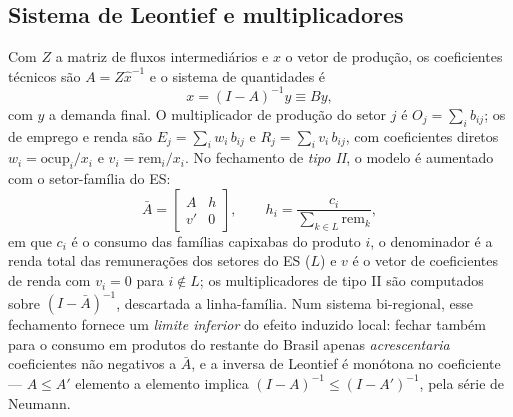 \documentclass[11pt,a4paper]{article}
\begin{document}
\subsection{Sistema de Leontief e multiplicadores}
\label{ap:leontief}
Com $Z$ a matriz de fluxos intermediários e $x$ o vetor de produção, os coeficientes técnicos
são $A=Z\hat{x}^{-1}$ e o sistema de quantidades é
\begin{equation}
x=(I-A)^{-1}y \equiv By,
\label{eq:leontief}
\end{equation}
com $y$ a demanda final. O multiplicador de produção do setor $j$ é $O_j=\sum_i b_{ij}$; os de
emprego e renda são $E_j=\sum_i w_i\,b_{ij}$ e $R_j=\sum_i v_i\,b_{ij}$, com coeficientes
diretos $w_i=\mathrm{ocup}_i/x_i$ e $v_i=\mathrm{rem}_i/x_i$. No fechamento de
\emph{tipo II}, o modelo é aumentado com o setor-família do ES:
\begin{equation}
\bar{A}=\begin{bmatrix} A & h\\ v' & 0\end{bmatrix},
\qquad h_i=\frac{c_i}{\sum_{k\in L}\mathrm{rem}_k},
\label{eq:tipo2}
\end{equation}
em que $c_i$ é o consumo das famílias capixabas do produto $i$, o denominador é a renda
total das remunerações dos setores do ES ($L$) e $v$ é o vetor de coeficientes de renda
com $v_i=0$ para $i\notin L$; os multiplicadores de tipo II são computados sobre
$(I-\bar{A})^{-1}$, descartada a linha-família. Num sistema bi-regional, esse fechamento
fornece um \emph{limite inferior} do efeito induzido local: fechar também para o consumo
em produtos do restante do Brasil apenas \emph{acrescentaria} coeficientes não negativos
a $\bar{A}$, e a inversa de Leontief é monótona no coeficiente --- $A\le A'$ elemento a
elemento implica $(I-A)^{-1}\le(I-A')^{-1}$, pela série de Neumann.
\end{document}
